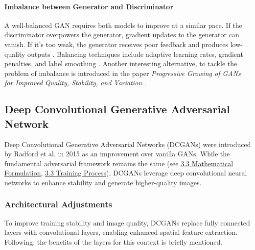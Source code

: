 \paragraph[Imbalance between Generator and Discriminator]{Imbalance between Generator and Discriminator}
A well-balanced GAN requires both models to improve at a similar pace. If the discriminator overpowers the generator, gradient updates to the generator can vanish. If it's too weak, the generator receives poor feedback and produces low-quality outputs \cite{goodfellow2014generativeadversarialnetworks}. Balancing techniques include adaptive learning rates, gradient penalties, and label smoothing \cite{Radford2015DCGAN}. Another interesting alternative, to tackle the problem of imbalance is introduced in the paper \textit{Progressive Growing of GANs for Improved Quality, Stability, and Variation} \cite{karras2018progressivegrowinggansimproved}.


\subsection[Deep Convolutional Generative Adversarial Network - DCGAN]{Deep Convolutional Generative Adversarial Network}\label{theoretical_dcgan}
Deep Convolutional Generative Adversarial Networks (DCGANs) were introduced by Radford et al. in 2015 \cite{Radford2015DCGAN} as an improvement over vanilla GANs. While the fundamental adversarial framework remains the same (see \hyperref[theoretical_gan_math]{3.3 Mathematical Formulation}, \hyperref[theoretical_gan_training]{3.3 Training Process}), DCGANs leverage deep convolutional neural networks to enhance stability and generate higher-quality images.

\subsubsection{Architectural Adjustments}\label{theorey_dcgan_architecture}
To improve training stability and image quality, DCGANs replace fully connected layers with convolutional layers, enabling enhanced spatial feature extraction. Following, the benefits of the layers for this context is briefly mentioned.

